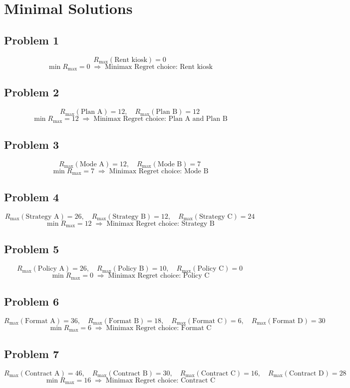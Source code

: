 \section{Minimal Solutions}
\subsection*{Problem 1}
\[
R_{\max}(\text{Rent kiosk})=0
\]
\[
\min R_{\max}=0\;\Rightarrow\;\text{Minimax Regret choice: Rent kiosk}
\]

\subsection*{Problem 2}
\[
R_{\max}(\text{Plan A})=12,\quad R_{\max}(\text{Plan B})=12
\]
\[
\min R_{\max}=12\;\Rightarrow\;\text{Minimax Regret choice: Plan A and Plan B}
\]

\subsection*{Problem 3}
\[
R_{\max}(\text{Mode A})=12,\quad R_{\max}(\text{Mode B})=7
\]
\[
\min R_{\max}=7\;\Rightarrow\;\text{Minimax Regret choice: Mode B}
\]

\subsection*{Problem 4}
\[
R_{\max}(\text{Strategy A})=26,\quad R_{\max}(\text{Strategy B})=12,\quad R_{\max}(\text{Strategy C})=24
\]
\[
\min R_{\max}=12\;\Rightarrow\;\text{Minimax Regret choice: Strategy B}
\]

\subsection*{Problem 5}
\[
R_{\max}(\text{Policy A})=26,\quad R_{\max}(\text{Policy B})=10,\quad R_{\max}(\text{Policy C})=0
\]
\[
\min R_{\max}=0\;\Rightarrow\;\text{Minimax Regret choice: Policy C}
\]

\subsection*{Problem 6}
\[
R_{\max}(\text{Format A})=36,\quad R_{\max}(\text{Format B})=18,\quad R_{\max}(\text{Format C})=6,\quad R_{\max}(\text{Format D})=30
\]
\[
\min R_{\max}=6\;\Rightarrow\;\text{Minimax Regret choice: Format C}
\]

\subsection*{Problem 7}
\[
R_{\max}(\text{Contract A})=46,\quad R_{\max}(\text{Contract B})=30,\quad R_{\max}(\text{Contract C})=16,\quad R_{\max}(\text{Contract D})=28
\]
\[
\min R_{\max}=16\;\Rightarrow\;\text{Minimax Regret choice: Contract C}
\]

